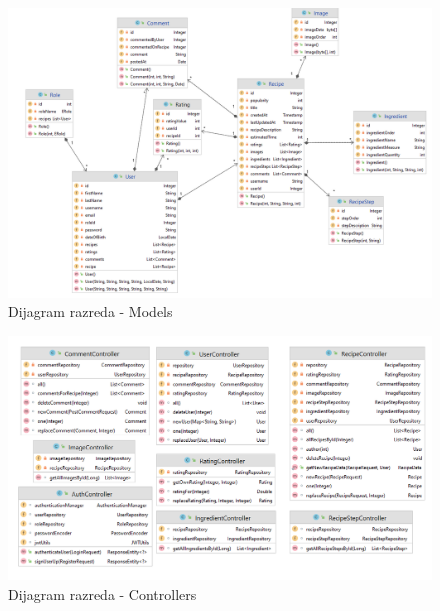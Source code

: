 \begin{figure}[H]
	\includegraphics[scale=0.55]{slike/modelsDiagram.PNG} %
	\centering
	\caption{Dijagram razreda - Models}
	\label{fig:promjene}
\end{figure}

\begin{figure}[H]
	\includegraphics[scale=0.6]{slike/controllerDiagram.PNG} %
	\centering
	\caption{Dijagram razreda - Controllers}
	\label{fig:promjene}
\end{figure}

